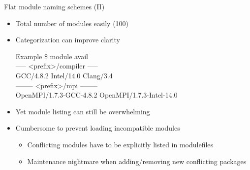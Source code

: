 \documentclass[10pt,xcolor={usenames,dvipsnames}]{beamer}
\begin{document}

\begin{frame}{Flat module naming schemes (II)}
\begin{itemize}
    \item
        Total number of modules easily (100)
    \item
        Categorization can improve clarity\\
        \enskip
        \begin{minipage}{0.9\textwidth}
            \begin{exampleblock}{Example}
                \ttfamily\small{
                \$ module avail\\
                ----- <prefix>/compiler -----\\
                GCC/4.8.2 \quad Intel/14.0 \quad Clang/3.4\\
                -------- <prefix>/mpi --------\\
                OpenMPI/1.7.3-GCC-4.8.2 \quad OpenMPI/1.7.3-Intel-14.0}
            \end{exampleblock}
        \end{minipage}
    \smallskip
    \item
        Yet module listing can still be overwhelming
    \item
        Cumbersome to prevent loading incompatible modules
        \begin{itemize}
            \item
                Conflicting modules have to be explicitly listed in modulefiles
            \item
                Maintenance nightmare when adding/removing new conflicting
                packages
        \end{itemize}
\end{itemize}
\end{frame}

\end{document}
